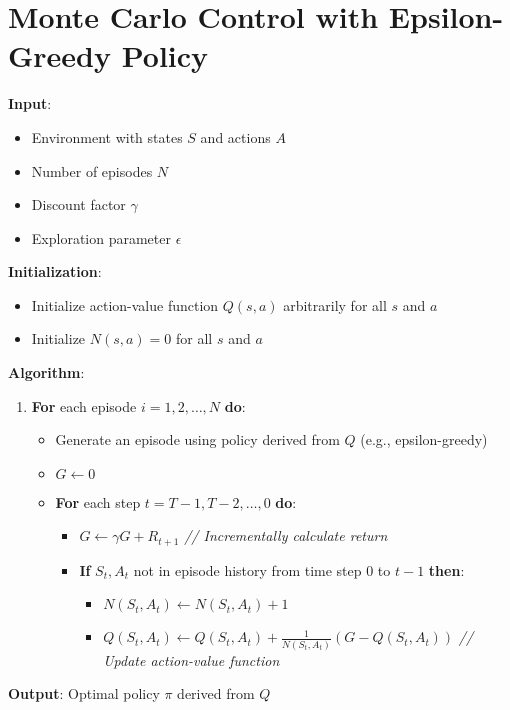 \documentclass{article}
\begin{document}
\section*{Monte Carlo Control with Epsilon-Greedy Policy}

\textbf{Input}:
\begin{itemize}
    \item Environment with states \( S \) and actions \( A \)
    \item Number of episodes \( N \)
    \item Discount factor \( \gamma \)
    \item Exploration parameter \( \epsilon \)
\end{itemize}

\textbf{Initialization}:
\begin{itemize}
    \item Initialize action-value function \( Q(s, a) \) arbitrarily for all \( s \) and \( a \)
    \item Initialize \( N(s, a) = 0 \) for all \( s \) and \( a \)
\end{itemize}

\textbf{Algorithm}:
\begin{enumerate}
    \item \textbf{For} each episode \( i = 1, 2, \ldots, N \) \textbf{do}:
    \begin{itemize}
        \item Generate an episode using policy derived from \( Q \) (e.g., epsilon-greedy)
        \item \( G \leftarrow 0 \)
        \item \textbf{For} each step \( t = T-1, T-2, \ldots, 0 \) \textbf{do}:
        \begin{itemize}
            \item \( G \leftarrow \gamma G + R_{t+1} \) \quad \textit{// Incrementally calculate return}
            \item \textbf{If} \( S_t, A_t \) not in episode history from time step 0 to \( t-1 \) \textbf{then}:
            \begin{itemize}
                \item \( N(S_t, A_t) \leftarrow N(S_t, A_t) + 1 \)
                \item \( Q(S_t, A_t) \leftarrow Q(S_t, A_t) + \frac{1}{N(S_t, A_t)} (G - Q(S_t, A_t)) \) \quad \textit{// Update action-value function}
            \end{itemize}
        \end{itemize}
    \end{itemize}
\end{enumerate}

\textbf{Output}: Optimal policy \( \pi \) derived from \( Q \)
\end{document}
